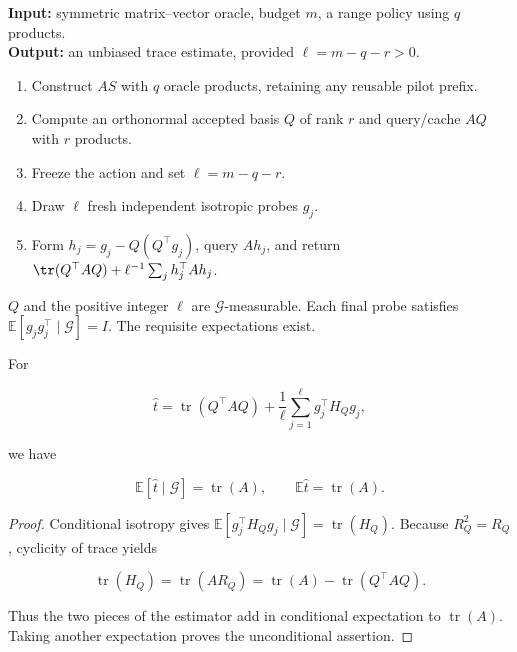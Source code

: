 \begin{algorithm}
\caption{Frozen-action trace estimation: accounting template}\label{alg:frozen}
\textbf{Input:} symmetric matrix--vector oracle, budget $m$, a range policy using $q$ products.\\
\textbf{Output:} an unbiased trace estimate, provided $\ell=m-q-r>0$.
\begin{enumerate}
\item Construct $AS$ with $q$ oracle products, retaining any reusable pilot prefix.
\item Compute an orthonormal accepted basis $Q$ of rank $r$ and query/cache $AQ$ with $r$ products.
\item Freeze the action and set $\ell=m-q-r$.
\item Draw $\ell$ fresh independent isotropic probes $g_j$.
\item Form $h_j=g_j-Q(Q^\top g_j)$, query $Ah_j$, and return
$\tr(Q^\top AQ)+\ell^{-1}\sum_j h_j^\top Ah_j$.
\end{enumerate}
\end{algorithm}
\begin{theorem}\label{thm:T2}
$Q$ and the positive integer $\ell$ are $\mathcal G$-measurable. Each final probe satisfies $\mathbb E[g_jg_j^\top\mid\mathcal G]=I$. The requisite expectations exist.


For


\begin{equation}
\widehat t=\operatorname{tr}(Q^\top AQ)+\frac1\ell\sum_{j=1}^{\ell}g_j^\top H_Qg_j,
\end{equation}


we have


\begin{equation}
\mathbb E[\widehat t\mid\mathcal G]=\operatorname{tr}(A),\qquad
\mathbb E\widehat t=\operatorname{tr}(A).
\end{equation}


\end{theorem}
\begin{proof}
Conditional isotropy gives $\mathbb E[g_j^\top H_Qg_j\mid\mathcal G]=\operatorname{tr}(H_Q)$. Because $R_Q^2=R_Q$, cyclicity of trace yields


\begin{equation}
\operatorname{tr}(H_Q)=\operatorname{tr}(AR_Q)
=\operatorname{tr}(A)-\operatorname{tr}(Q^\top AQ).
\end{equation}


Thus the two pieces of the estimator add in conditional expectation to $\operatorname{tr}(A)$. Taking another expectation proves the unconditional assertion.

\end{proof}


